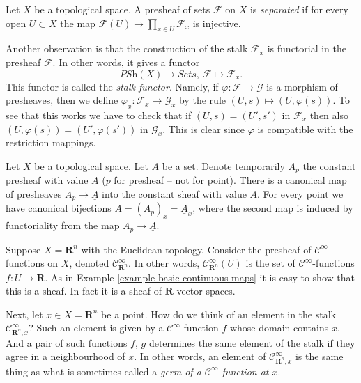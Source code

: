 \begin{definition}
\label{definition-separated}
Let $X$ be a topological space.
A presheaf of sets $\mathcal{F}$ on $X$ is {\it separated}
if for every open $U \subset X$ the map
$\mathcal{F}(U) \to \prod_{x \in U} \mathcal{F}_x$ is
injective.
\end{definition}

\noindent
Another observation is that the construction of the stalk
$\mathcal{F}_x$ is functorial in the presheaf $\mathcal{F}$.
In other words, it gives a functor
$$
\textit{PSh}(X) \longrightarrow \textit{Sets},
\ \mathcal{F} \longmapsto \mathcal{F}_x.
$$
This functor is called the {\it stalk functor}.
Namely, if $\varphi : \mathcal{F} \to \mathcal{G}$ is
a morphism of presheaves, then we define
$\varphi_x : \mathcal{F}_x \to \mathcal{G}_x$
by the rule $(U, s) \mapsto (U, \varphi(s))$.
To see that this works we have to check that
if $(U, s) = (U', s')$ in $\mathcal{F}_x$ then also
$(U, \varphi(s)) = (U', \varphi(s'))$ in $\mathcal{G}_x$.
This is clear since $\varphi$ is compatible with the
restriction mappings.

\begin{example}
\label{example-stalk-constant-presheaf}
Let $X$ be a topological space. Let $A$ be a set.
Denote temporarily $A_p$ the constant presheaf
with value $A$ ($p$ for presheaf -- not for point).
There is a canonical map of presheaves
$A_p \to \underline{A}$ into the constant sheaf with
value $A$. For every point we have canonical
bijections $A = (A_p)_x = \underline{A}_x$, where
the second map is induced by functoriality from
the map $A_p \to \underline{A}$.
\end{example}



\begin{example}
\label{example-germs-functions}
Suppose $X = \mathbf{R}^n$ with the Euclidean topology.
Consider the presheaf of $\mathcal{C}^\infty$ functions
on $X$, denoted $\mathcal{C}^\infty_{\mathbf{R}^n}$.
In other words, $\mathcal{C}^\infty_{\mathbf{R}^n}(U)$ is the set
of $\mathcal{C}^\infty$-functions $f : U \to \mathbf{R}$.
As in Example \ref{example-basic-continuous-maps}
it is easy to show that this is a sheaf. In fact it
is a sheaf of $\mathbf{R}$-vector spaces.

\medskip\noindent
Next, let $x \in X = \mathbf{R}^n$ be a point. How do
we think of an element in the stalk $\mathcal{C}^\infty_{\mathbf{R}^n, x}$?
Such an element is given by a $\mathcal{C}^\infty$-function
$f$ whose domain contains $x$. And a pair of such
functions $f$, $g$ determines
the same element of the stalk if they agree in a neighbourhood
of $x$. In other words, an element of $\mathcal{C}^\infty_{\mathbf{R}^n, x}$
is the same thing as what is sometimes called
a {\it germ of a $\mathcal{C}^\infty$-function at $x$}.
\end{example}

